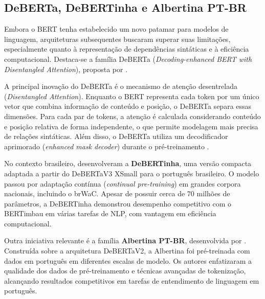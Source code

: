 \documentclass[
    12pt,                %
    openright,           %
    oneside,             %
    a4paper,             %
    english,             %
    brazil               %
]{abntex2}
\begin{document}
\subsection{DeBERTa, DeBERTinha e Albertina PT-BR}

Embora o BERT tenha estabelecido um novo patamar para modelos de linguagem, arquiteturas subsequentes buscaram superar suas limitações, especialmente quanto à representação de dependências sintáticas e à eficiência computacional. Destaca-se a família DeBERTa (\textit{Decoding-enhanced BERT with Disentangled Attention}), proposta por .

A principal inovação do DeBERTa é o mecanismo de atenção desentrelada (\textit{Disentangled Attention}). Enquanto o BERT representa cada token por um único vetor que combina informação de conteúdo e posição, o DeBERTa separa essas dimensões. Para cada par de tokens, a atenção é calculada considerando conteúdo e posição relativa de forma independente, o que permite modelagem mais precisa de relações sintáticas. Além disso, o DeBERTa utiliza um decodificador aprimorado (\textit{enhanced mask decoder}) durante o pré-treinamento \cite{He2021}.

No contexto brasileiro,  desenvolveram a \textbf{DeBERTinha}, uma versão compacta adaptada a partir do DeBERTaV3 XSmall para o português brasileiro. O modelo passou por adaptação contínua (\textit{continual pre-training}) em grandes corpora nacionais, incluindo o brWaC. Apesar de possuir cerca de 70 milhões de parâmetros, a DeBERTinha demonstrou desempenho competitivo com o BERTimbau em várias tarefas de NLP, com vantagem em eficiência computacional.

Outra iniciativa relevante é a família \textbf{Albertina PT-BR}, desenvolvida por . Construída sobre a arquitetura DeBERTaV2, a Albertina foi pré-treinada com dados em português em diferentes escalas de modelo. Os autores enfatizaram a qualidade dos dados de pré-treinamento e técnicas avançadas de tokenização, alcançando resultados competitivos em tarefas de entendimento de linguagem em português.


\end{document}
